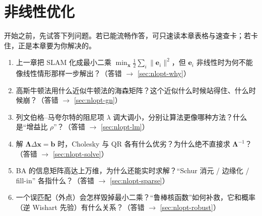 \chapter{非线性优化}
\label{ch:nlopt}


\begin{practice}[前置自测]
开始之前，先试答下列问题。若已能流畅作答，可只速读本章表格与速查卡；若卡住，正是本章要为你解决的。
\begin{enumerate}
  \item 上一章把 SLAM 化成最小二乘 $\min_{\mathbf{x}}\tfrac12\sum_i\|\mathbf{e}_i\|^2$，但 $\mathbf{e}_i$ 非线性时为何不能像线性情形那样一步解出？（答错 $\to$ \cref{sec:nlopt-why}）
  \item 高斯牛顿法用什么近似牛顿法的海森矩阵？这个近似什么时候站得住、什么时候崩？（答错 $\to$ \cref{sec:nlopt-gn}）
  \item 列文伯格–马夸尔特的阻尼项 $\lambda$ 调大调小，分别让算法更像哪种方法？什么是“增益比 $\rho$”？（答错 $\to$ \cref{sec:nlopt-lm}）
  \item 解 $\boldsymbol{\Lambda}\Delta\mathbf{x}=\mathbf{b}$ 时，Cholesky 与 QR 各有什么优劣？为什么绝不直接求 $\boldsymbol{\Lambda}^{-1}$？（答错 $\to$ \cref{sec:nlopt-solve}）
  \item BA 的信息矩阵高达上万维，为什么还能实时求解？“Schur 消元 / 边缘化 / fill-in” 各指什么？（答错 $\to$ \cref{sec:nlopt-sparse}）
  \item 一个误匹配（外点）会怎样毁掉最小二乘？“鲁棒核函数”如何补救，它和概率（逆 Wishart 先验）有什么关系？（答错 $\to$ \cref{sec:nlopt-robust}）
\end{enumerate}
\end{practice}

